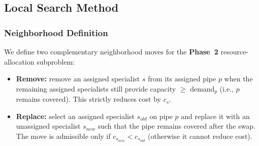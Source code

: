 \documentclass{article}
\begin{document}





\subsection{Local Search Method}
\label{sec:localsearch}

\subsubsection{Neighborhood Definition}
We define two complementary neighborhood moves for the \textbf{Phase~2} resource-allocation subproblem:

\begin{itemize}
    \item \textbf{Remove:} remove an assigned specialist $s$ from its assigned pipe $p$ when the remaining assigned specialists still provide capacity $\ge$ demand$_p$ (i.e., $p$ remains covered). This strictly reduces cost by $c_s$.
    \item \textbf{Replace:} select an assigned specialist $s_{old}$ on pipe $p$ and replace it with an unassigned specialist $s_{new}$ such that the pipe remains covered after the swap. The move is admissible only if $c_{s_{new}} < c_{s_{old}}$ (otherwise it cannot reduce cost).
\end{itemize}
\end{document}
